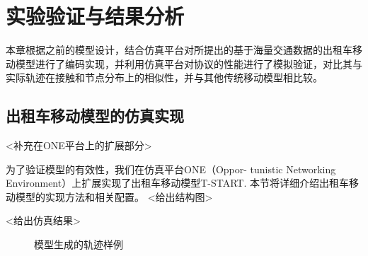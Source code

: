 \chapter{实验验证与结果分析}

本章根据之前的模型设计，结合仿真平台对所提出的基于海量交通数据的出租车移动模型进行了编码实现，并利用仿真平台对协议的性能进行了模拟验证，对比其与实际轨迹在接触和节点分布上的相似性，并与其他传统移动模型相比较。

\section{出租车移动模型的仿真实现}
<补充在ONE平台上的扩展部分>

为了验证模型的有效性，我们在仿真平台ONE（Oppor- tunistic Networking Environment）\cite{KeranenOtt-155}上扩展实现了出租车移动模型T-START. 本节将详细介绍出租车移动模型的实现方法和相关配置。
<给出结构图>

<给出仿真结果>

\begin{figure}[ht]
\centering
{}
\caption{模型生成的轨迹样例}\label{figure_tracesample}
\end{figure}

